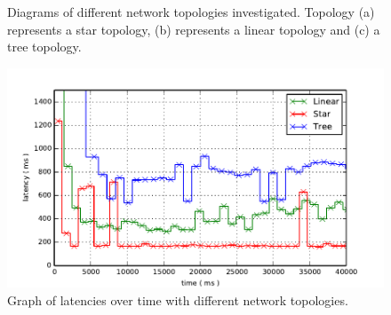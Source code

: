 \begin{figure}[t]
  \centering
  \caption{Diagrams of different network topologies investigated. Topology (a) represents a star topology, (b) represents a linear topology and (c) a tree topology.}
  \label{fig:topo-diagram}
\end{figure}

\begin{figure}
  \includegraphics{include/topos.pdf}
  \caption{Graph of latencies over time with different network topologies.}
  \label{fig:topo-graph}
\end{figure}

